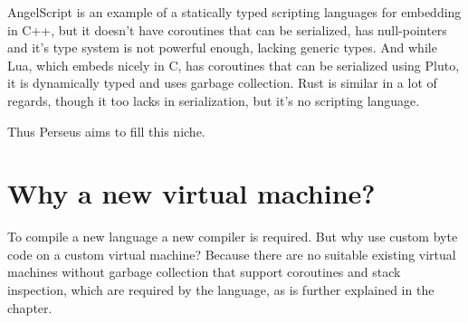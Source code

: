 	AngelScript\cite{angelscript} is an example of a statically typed scripting languages for embedding in C++, but it doesn't have coroutines that can be serialized, has null-pointers and it's type system is not powerful enough, lacking generic types. And while Lua\cite{lua}, which embeds nicely in C, has coroutines that can be serialized using Pluto\cite{pluto}, it is dynamically typed and uses garbage collection. Rust\cite{rust} is similar in a lot of regards, though it too lacks in serialization, but it's no scripting language.
	
	Thus Perseus aims to fill this niche.
	
	\section{Why a new virtual machine?}
	
	To compile a new language a new compiler is required. But why use custom byte code on a custom virtual machine? Because there are no suitable existing virtual machines without garbage collection that support coroutines and stack inspection, which are required by the language, as is further explained in the  chapter.
